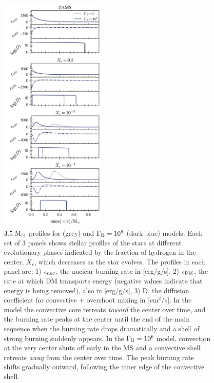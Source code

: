 \documentclass[useAMS,usenatbib]{mnras}
\begin{document}
  \begin{figure}
    \centering
    \includegraphics[width=0.47\textwidth]{plots/m3p5.png}
    \caption{$3.5 \ \mathrm{M}_{\odot}$ profiles for \nodm (grey) and $\Gamma_\mathrm{B} = 10^{6}$ (dark blue) models. Each set of 3 panels shows stellar profiles of the stars at different evolutionary phases indicated by the fraction of hydrogen in the center, $X_c$, which decreases as the star evolves. The profiles in each panel are: 1) $\epsilon_{\mathrm{nuc}}$, the nuclear burning rate in [erg/g/s], 2) $\epsilon_{\mathrm{DM}}$, the rate at which DM transports energy (negative values indicate that energy is being removed), also in [erg/g/s], 3) D, the diffusion coefficient for convective + overshoot mixing in [cm$^2$/s]. In the \nodm model the convective core retreats \textit{toward} the center over time, and the burning rate peaks at the center until the end of the main sequence when the burning rate drops dramatically and a shell of strong burning suddenly appears. In the $\Gamma_\mathrm{B} = 10^{6}$ model, convection at the very center shuts off early in the MS and a convective shell retreats \textit{away} from the center over time. The peak burning rate shifts gradually outward, following the inner edge of the convective shell.
    }
    \label{fig:m3p5}
  \end{figure}
\end{document}
